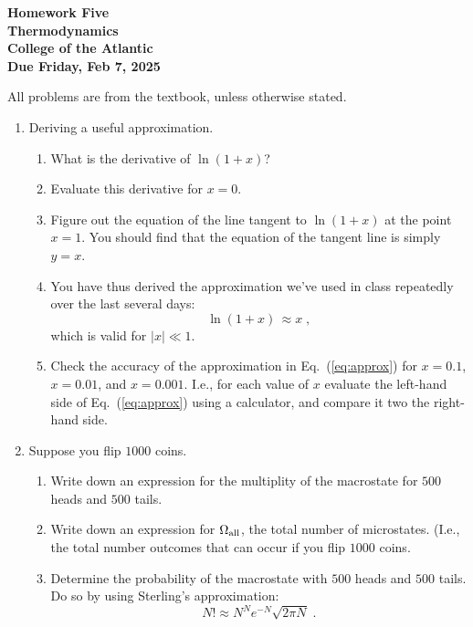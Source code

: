 \documentclass[12pt]{article}
\begin{document}
\pagestyle{empty}
 
\begin{center}
{\LARGE {\bf Homework Five}}\\
\medskip
{\Large {\bf Thermodynamics}}\\
\medskip
{\Large {\bf College of the Atlantic}}\\
\medskip
{ {\bf Due Friday, Feb 7, 2025}}\\  
\end{center}
\medskip


\noindent All problems are from the textbook, unless otherwise stated. 


\begin{enumerate}
  \setlength{\itemsep}{4mm}

\item Deriving a useful approximation.
  \begin{enumerate}
  \item What is the derivative of $\ln(1+x)$?
  \item Evaluate this derivative for $x=0$.
  \item Figure out the equation of the line tangent to $\ln(1+x)$ at
    the point $x=1$. You should find that the equation of the tangent
    line is simply $y=x$.
  \item You have thus derived the approximation we've used in class
    repeatedly over the last several days:
    \begin{equation}
      \ln(1+x) \, \approx x \;,
      \label{eq:approx}
    \end{equation}
    which is valid for $|x|\ll 1$.  
    \item Check the accuracy of the approximation in
      Eq.~(\ref{eq:approx}) for $x=0.1$, $x=0.01$, and
      $x=0.001$. I.e., for each value of $x$ evaluate the left-hand
      side of Eq.~(\ref{eq:approx}) using a calculator, and compare it
      two the right-hand side.
  \end{enumerate}

  
\item Suppose you flip $1000$ coins.
  \begin{enumerate}
    \item Write down an expression for the multiplity of the
      macrostate for $500$ heads and $500$ tails.
    \item Write down an expression for $\Omega_{\rm all}$, the total
      number of microstates. (I.e., the total number outcomes that can
      occur if you flip $1000$ coins.
    \item Determine the probability of the macrostate with $500$ heads
      and $500$ tails. Do so by using Sterling's approximation:
      \begin{equation}
        N! \approx N^Ne^{-N}\sqrt{2\pi N} \;.
      \end{equation}
  \end{enumerate}


\end{enumerate}
\end{document}
